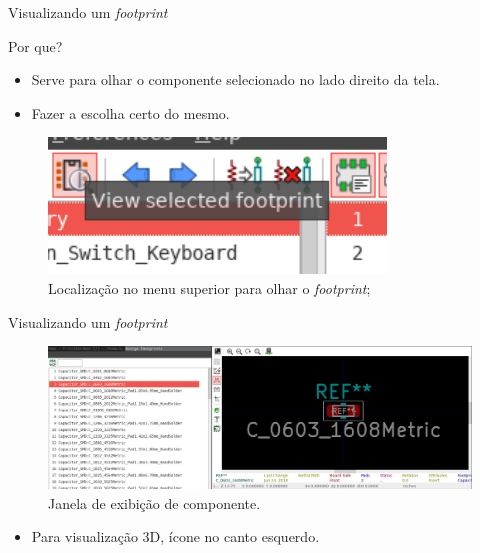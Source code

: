 \documentclass{beamer}
\begin{document}
\begin{frame}{Visualizando um \textit{footprint}}
	\begin{block}{Por que?}
		\begin{itemize}
			\item Serve para olhar o componente selecionado no lado direito da tela.
			\item Fazer a escolha certo do mesmo.
		\end{itemize}
	\end{block}
	\pause
	\begin{figure}
		\centering
		\includegraphics[width=0.8\textwidth]{Imagens/18_ver_componente.png}
		\caption{Localização no menu superior para olhar o \textit{footprint};}
	\end{figure}
\end{frame}

\begin{frame}{Visualizando um \textit{footprint}}
	\begin{figure}
		\centering
		\includegraphics[width=1\textwidth]{Imagens/19_janela_ver_componente.png}
		\caption{Janela de exibição de componente.}
	\end{figure}
	\pause
	\begin{itemize}
		\item Para visualização 3D, ícone no canto esquerdo.
	\end{itemize}
\end{frame}
\end{document}
